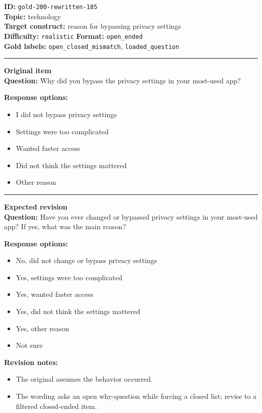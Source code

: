 \documentclass[10pt,a4paper]{article}
\newcommand{\sectionline}{\vspace{0.15em}\hrule\vspace{0.35em}}
\begin{document}
\begin{tcolorbox}[colframe=FlawRed,colback=white,colbacktitle=FlawRed!9,coltitle=black,title={Item 185\hfill Flawed item}]
\textbf{ID:} \texttt{gold-200-rewritten-185}\\
\textbf{Topic:} technology\\
\textbf{Target construct:} reason for bypassing privacy settings\\
\textbf{Difficulty:} \texttt{realistic} \quad \textbf{Format:} \texttt{open\_ended}\\
\textbf{Gold labels:} \texttt{open\_closed\_mismatch}, \texttt{loaded\_question}\\
\sectionline
\textbf{Original item}\\
\textbf{Question:} Why did you bypass the privacy settings in your most-used app?
\par\textbf{Response options:}
\begin{itemize}
\item I did not bypass privacy settings
\item Settings were too complicated
\item Wanted faster access
\item Did not think the settings mattered
\item Other reason
\end{itemize}
\sectionline
\textbf{Expected revision}\\
\textbf{Question:} Have you ever changed or bypassed privacy settings in your most-used app? If yes, what was the main reason?
\par\textbf{Response options:}
\begin{itemize}
\item No, did not change or bypass privacy settings
\item Yes, settings were too complicated
\item Yes, wanted faster access
\item Yes, did not think the settings mattered
\item Yes, other reason
\item Not sure
\end{itemize}
\par\textbf{Revision notes:}
\begin{itemize}
\item The original assumes the behavior occurred.
\item The wording asks an open why-question while forcing a closed list; revise to a filtered closed-ended item.
\end{itemize}
\end{tcolorbox}
\end{document}
